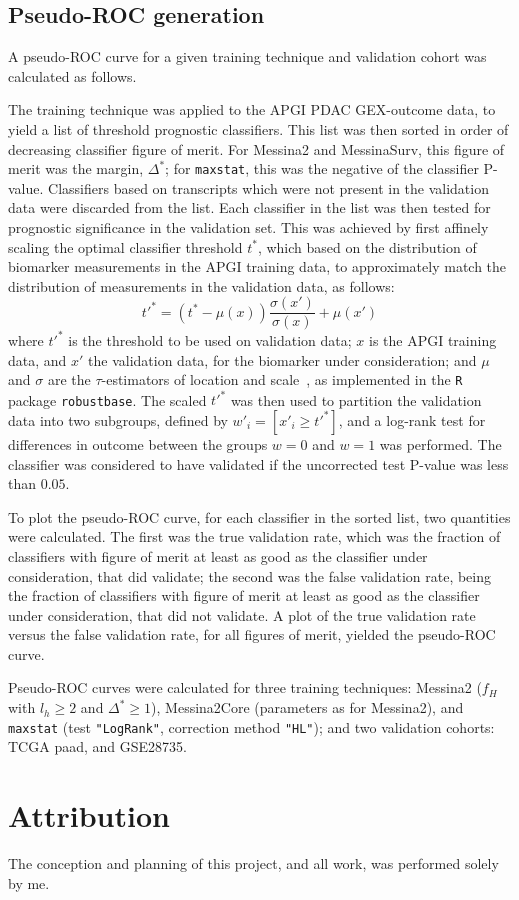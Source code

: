 \documentclass[dissertation.tex]{subfiles}
\begin{document}
\subsection{Pseudo-\texorpdfstring{\acrshort{ROC}}{ROC} generation}
A pseudo-\gls{ROC} curve for a given training technique and validation cohort was calculated as follows.

The training technique was applied to the \gls{APGI} \gls{PDAC} \gls{GEX}-outcome data, to yield a list of threshold prognostic classifiers.  This list was then sorted in order of decreasing classifier figure of merit.  For Messina2 and MessinaSurv, this figure of merit was the margin, $\Delta^*$; for \texttt{maxstat}, this was the negative of the classifier P-value.  Classifiers based on transcripts which were not present in the validation data were discarded from the list.  Each classifier in the list was then tested for prognostic significance in the validation set.  This was achieved by first affinely scaling the optimal classifier threshold $t^*$, which based on the distribution of biomarker measurements in the \gls{APGI} training data, to approximately match the distribution of measurements in the validation data, as follows: 
\begin{equation*}
t'^* = \left(t^* - \mu(x)\right)\frac{\sigma(x')}{\sigma(x)} + \mu(x')
\end{equation*}
where $t'^*$ is the threshold to be used on validation data; $x$ is the \gls{APGI} training data, and $x'$ the validation data, for the biomarker under consideration; and $\mu$ and $\sigma$ are the $\tau$-estimators of location and scale~\cite{Maronna2002}, as implemented in the \texttt{R} package \texttt{robustbase}.  The scaled $t'^*$  was then used to partition the validation data into two subgroups, defined by $w'_i = [x'_i \geq t'^*]$, and a log-rank test for differences in outcome between the groups $w = 0$ and $w = 1$ was performed.  The classifier was considered to have validated if the uncorrected test P-value was less than $0.05$.

To plot the pseudo-\gls{ROC} curve, for each classifier in the sorted list, two quantities were calculated.  The first was the true validation rate, which was the fraction of classifiers with figure of merit at least as good as the classifier under consideration, that did validate; the second was the false validation rate, being the fraction of classifiers with figure of merit at least as good as the  classifier under consideration, that did not validate.  A plot of the true validation rate versus the false validation rate, for all figures of merit, yielded the pseudo-\gls{ROC} curve.

Pseudo-\gls{ROC} curves were calculated for three training techniques: Messina2 ($f_H$ with $l_h \geq 2$ and $\Delta^* \geq 1$), Messina2Core (parameters as for Messina2), and \texttt{maxstat} (test \texttt{"LogRank"}, correction method \texttt{"HL"}); and two validation cohorts: \gls{TCGA} paad, and GSE28735.

\section{Attribution}
The conception and planning of this project, and all work, was performed solely by me.
\end{document}
